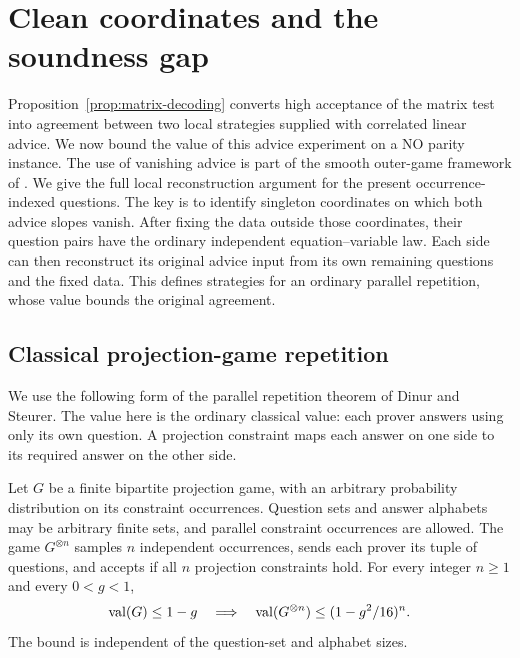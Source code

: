 \section{Clean coordinates and the soundness gap}
\label{sec:clean}

Proposition~\ref{prop:matrix-decoding} converts high acceptance of the
matrix test into agreement between two local strategies supplied with
correlated linear advice.  We now bound the value of this advice
experiment on a NO parity instance.  The use of vanishing advice is part
of the smooth outer-game framework of
\cite[Sections~3.3--3.4]{KMS17}.  We give the full local reconstruction
argument for the present occurrence-indexed questions.  The key is to
identify singleton coordinates on which both advice slopes vanish.
After fixing the data outside those coordinates, their question pairs
have the ordinary independent equation--variable law.  Each side can
then reconstruct its original advice input from its own remaining
questions and the fixed data.  This defines strategies for an ordinary
parallel repetition, whose value bounds the original agreement.

\subsection{Classical projection-game repetition}

We use the following form of the parallel repetition theorem of
Dinur and Steurer.  The value here is the ordinary classical value:
each prover answers using only its own question.  A projection
constraint maps each answer on one side to its required answer on the
other side.

\begin{theorem}
\label{thm:repetition}
Let $G$ be a finite bipartite projection game, with an arbitrary
probability distribution on its constraint occurrences.  Question sets
and answer alphabets may be arbitrary finite sets, and parallel
constraint occurrences are allowed.  The game $G^{\otimes n}$ samples
$n$ independent occurrences, sends each prover its tuple of questions,
and accepts if all $n$ projection constraints hold.  For every integer
$n\ge1$ and every $0<g<1$,
\begin{equation}
 \operatorname{val}(G)\le 1-g
 \quad\Longrightarrow\quad
 \operatorname{val}(G^{\otimes n})\le (1-g^2/16)^n.
 \label{eq:projection-repetition}
\end{equation}
The bound is independent of the question-set and alphabet sizes.
\end{theorem}

